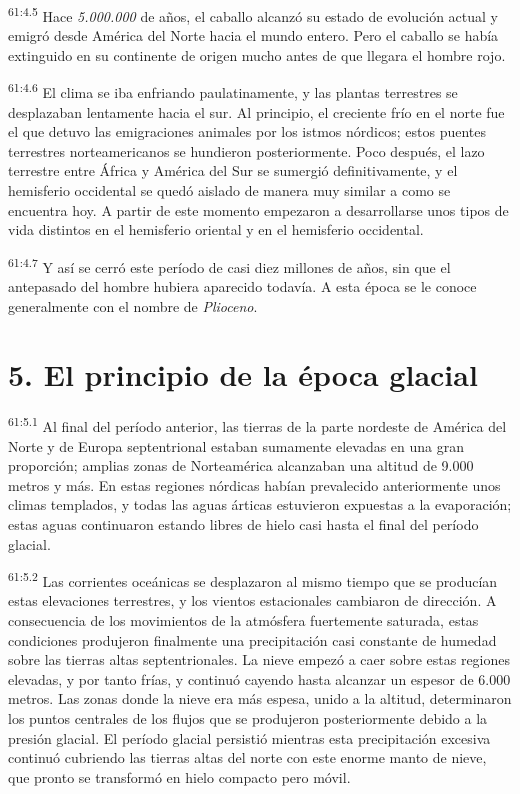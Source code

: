 \par
\textsuperscript{61:4.5} Hace \textit{5.000.000} de años, el caballo alcanzó su estado de evolución actual y emigró desde América del Norte hacia el mundo entero. Pero el caballo se había extinguido en su continente de origen mucho antes de que llegara el hombre rojo.

\par
\textsuperscript{61:4.6} El clima se iba enfriando paulatinamente, y las plantas terrestres se desplazaban lentamente hacia el sur. Al principio, el creciente frío en el norte fue el que detuvo las emigraciones animales por los istmos nórdicos; estos puentes terrestres norteamericanos se hundieron posteriormente. Poco después, el lazo terrestre entre África y América del Sur se sumergió definitivamente, y el hemisferio occidental se quedó aislado de manera muy similar a como se encuentra hoy. A partir de este momento empezaron a desarrollarse unos tipos de vida distintos en el hemisferio oriental y en el hemisferio occidental.

\par
\textsuperscript{61:4.7} Y así se cerró este período de casi diez millones de años, sin que el antepasado del hombre hubiera aparecido todavía. A esta época se le conoce generalmente con el nombre de \textit{Plioceno}.

\section*{5. El principio de la época glacial}
\par
\textsuperscript{61:5.1} Al final del período anterior, las tierras de la parte nordeste de América del Norte y de Europa septentrional estaban sumamente elevadas en una gran proporción; amplias zonas de Norteamérica alcanzaban una altitud de 9.000 metros y más. En estas regiones nórdicas habían prevalecido anteriormente unos climas templados, y todas las aguas árticas estuvieron expuestas a la evaporación; estas aguas continuaron estando libres de hielo casi hasta el final del período glacial.

\par
\textsuperscript{61:5.2} Las corrientes oceánicas se desplazaron al mismo tiempo que se producían estas elevaciones terrestres, y los vientos estacionales cambiaron de dirección. A consecuencia de los movimientos de la atmósfera fuertemente saturada, estas condiciones produjeron finalmente una precipitación casi constante de humedad sobre las tierras altas septentrionales. La nieve empezó a caer sobre estas regiones elevadas, y por tanto frías, y continuó cayendo hasta alcanzar un espesor de 6.000 metros. Las zonas donde la nieve era más espesa, unido a la altitud, determinaron los puntos centrales de los flujos que se produjeron posteriormente debido a la presión glacial. El período glacial persistió mientras esta precipitación excesiva continuó cubriendo las tierras altas del norte con este enorme manto de nieve, que pronto se transformó en hielo compacto pero móvil.

